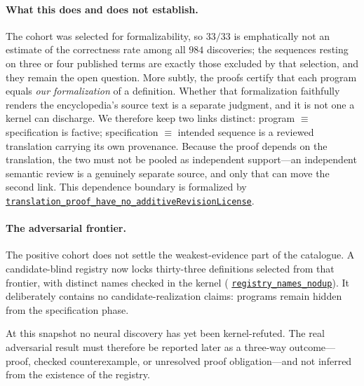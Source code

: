 \documentclass[11pt]{article}
\newcommand{\formalcommit}{f3a31db36bb2f944312ee31c1d86c2758109e83a}
\newcommand{\formalblob}{https://github.com/zariuq/MeTTapedia/blob/\formalcommit/lean/mettapedia/Mettapedia}
\newcommand{\leansource}[3]{%
  \href{\formalblob/#1\#L#2}{\nolinkurl{#3}}}
\newif\ifoeisadversarialfacts
\begin{document}
\paragraph{What this does and does not establish.} The cohort was selected for
formalizability, so $33/33$ is emphatically not an estimate of the correctness rate among
all $984$ discoveries; the sequences resting on three or four published terms are exactly
those excluded by that selection, and they remain the open question. More subtly, the
proofs certify that each program equals \emph{our formalization} of a definition. Whether
that formalization faithfully renders the encyclopedia's source text is a separate judgment,
and it is not one a kernel can discharge. We therefore keep two links distinct: program
$\equiv$ specification is factive; specification $\equiv$ intended sequence is a reviewed
translation carrying its own provenance. Because the proof depends on the translation, the
two must not be pooled as independent support---an independent semantic review is a
genuinely separate source, and only that can move the second link. This dependence boundary
is formalized by
\leansource{MachineLearning/SearchGuidance/ProgramDiscovery/ProofEvidenceNonIndependence.lean}{112-L119}{translation_proof_have_no_additiveRevisionLicense}.

\paragraph{The adversarial frontier.}
The positive cohort does not settle the weakest-evidence part of the catalogue. A
candidate-blind registry now locks thirty-three definitions selected from that frontier,
with distinct names checked in the kernel
(\leansource{Sequences/OEIS/Adversarial33Specifications.lean}{18-L28}{registry\_names\_nodup}).
It deliberately contains no candidate-realization claims: programs remain hidden from
the specification phase.
\ifoeisadversarialfacts
At the registry snapshot no neural discovery had been kernel-refuted; the post-seal
adjudication of Section~\ref{sec:postseal-adjudication} has since produced
refutations by independent executable replay, which is a strictly weaker evidence
grade than a kernel-checked counterexample. The kernel-grade adversarial result must
still be reported as a three-way outcome---proof, checked counterexample, or
unresolved proof obligation---and the executable adjudication below neither
anticipates nor replaces it.
\else
At this snapshot no neural discovery has yet been
kernel-refuted. The real adversarial result must therefore be reported later as a
three-way outcome---proof, checked counterexample, or unresolved proof obligation---and
not inferred from the existence of the registry.
\fi
\end{document}

